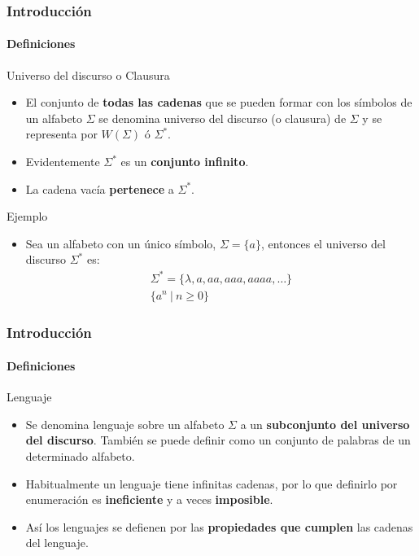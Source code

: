 \documentclass{beamer}
\begin{document}
        \begin{frame}
            \frametitle{Introducci\'on}
            \framesubtitle{Definiciones}

            \begin{block}{Universo del discurso o Clausura}
                \begin{itemize}
                    \item[\checkmark] El conjunto de \textbf{todas las cadenas} que se pueden formar con los s\'imbolos de un alfabeto $\Sigma$ se denomina universo del discurso (o clausura) de $\Sigma$  y se representa por $W(\Sigma)$ \'o $\Sigma^{*}$. 
                    \item[\checkmark] Evidentemente $\Sigma^{*}$ es un \textbf{conjunto infinito}. 
                    \item[\checkmark] La cadena vac\'ia \textbf{pertenece} a $\Sigma^{*}$.
                \end{itemize}
			\end{block}
			\begin{exampleblock}{Ejemplo}
                \begin{itemize}
                    \item[\checkmark] Sea un alfabeto con un \'unico s\'imbolo, $\Sigma = \{a\}$, entonces el universo del discurso $\Sigma^{*}$ es:
                    $$
                        \begin{array}{c}
                            \Sigma^{*} = \{\lambda, a, aa, aaa, aaaa,\ldots\} \\
                            \{a^{n}~|~n \geq 0 \}
                        \end{array}
                    $$
                \end{itemize}
            \end{exampleblock}
		\end{frame}

        \begin{frame}
            \frametitle{Introducci\'on}
            \framesubtitle{Definiciones}

            \begin{block}{Lenguaje}
                \begin{itemize}
                    \item[\checkmark] Se denomina lenguaje sobre un alfabeto $\Sigma$ a un \textbf{subconjunto del universo del discurso}. Tambi\'en se puede definir como un conjunto de palabras de un determinado alfabeto.
                    \item[\checkmark] Habitualmente un lenguaje tiene infinitas cadenas, por lo que definirlo por enumeraci\'on es \textbf{ineficiente} y a veces \textbf{imposible}.
                    \item[\checkmark] As\'i los lenguajes se defienen por las \textbf{propiedades que cumplen} las cadenas del lenguaje.
                \end{itemize}
			\end{block}
		\end{frame}
\end{document}
